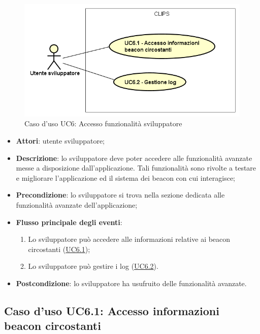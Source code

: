 \documentclass[../AnalisiDeiRequisiti.tex]{subfiles}
\begin{document}
\begin{figure}[H]
	\centering
	\includegraphics[scale=0.95, width=\textwidth]{img/UC6.png}
	\caption{Caso d'uso UC6: Accesso funzionalità sviluppatore}\label{fig:UC6} 
\end{figure}
\begin{itemize}
	\item \textbf{Attori}: utente sviluppatore;
	\item \textbf{Descrizione}: lo sviluppatore deve poter accedere alle funzionalità avanzate messe a disposizione dall'applicazione. Tali funzionalità sono rivolte a testare e migliorare l'applicazione ed il sistema dei beacon con cui interagisce; 
	\item \textbf{Precondizione}: lo sviluppatore si trova nella sezione dedicata alle funzionalità avanzate dell'applicazione;
	
	\item \textbf{Flusso principale degli eventi}:
	\begin{enumerate}
		\item Lo sviluppatore può accedere alle informazioni relative ai beacon circostanti (\hyperlink{UC6.1}{UC6.1});
		\item Lo sviluppatore può gestire i log (\hyperlink{UC6.2}{UC6.2}).
		
	\end{enumerate}
	\item \textbf{Postcondizione}: lo sviluppatore ha usufruito delle funzionalità avanzate.
\end{itemize}
\hypertarget{UC6.1}{}
\subsection{Caso d'uso UC6.1: Accesso informazioni beacon circostanti}
\end{document}
